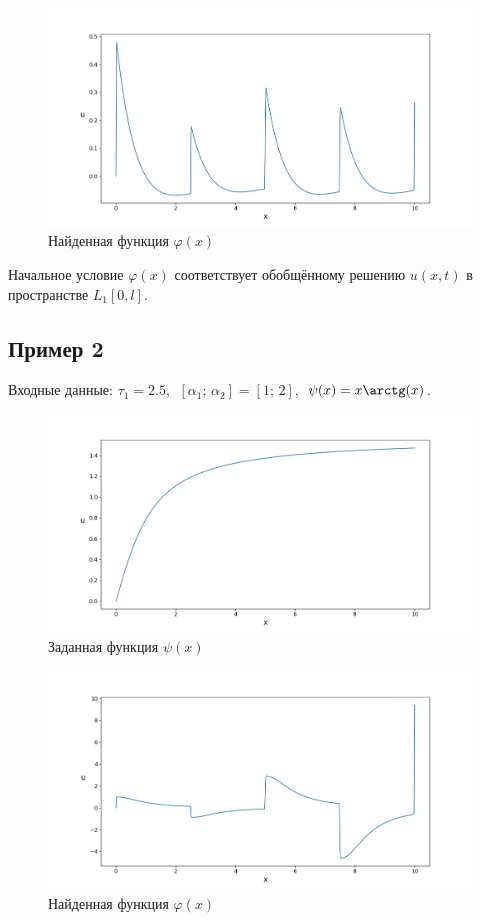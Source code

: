 \documentclass{article}
\theoremstyle{definition}
\begin{document}
\begin{figure}[H]
	\centering
	\includegraphics[trim={2.1cm, 0.6cm, 0, 1.5cm}, clip, scale=0.615]{1_u0.png}
	\caption{Найденная функция $\varphi(x)$}
	\label{fig:image2}
\end{figure}

Начальное условие $\varphi(x)$ соответствует обобщённому решению $u(x,t)$ в пространстве $L_1[0,l]$.

\newpage

\subsection{Пример 2}
Входные данные: $\tau_1 = 2.5$, $\;[\alpha_1;\, \alpha_2] = [1;\, 2]$, $\;\psi(x) = x \arctg(x)$.
\begin{figure}[H]
	\centering
	\includegraphics[trim={2.5cm, 0, 0, 1.5cm}, clip, scale=0.62]{2_psi.png}
	\caption{Заданная функция $\psi(x)$}
	\label{fig:image4}
\end{figure}

\begin{figure}[H]
	\centering
	\includegraphics[trim={2.5cm, 0, 0, 1.5cm}, clip, scale=0.62]{2_u0.png}
	\caption{Найденная функция $\varphi(x)$}
	\label{fig:image5}
\end{figure}
\end{document}
